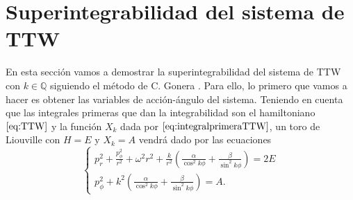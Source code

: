 \documentclass[12pt,a4paper,twoside]{article}
\theoremstyle{definition} \newtheorem{defn}[thm]{Definición}
\theoremstyle{definition} \newtheorem{ejemplo}[thm]{Ejemplo}
\theoremstyle{definition} \newtheorem{ejercicio}[thm]{Ejercicio}
\theoremstyle{remark} \newtheorem*{obs}{Observación}
\def\QQ{\mathbb{Q}}
\begin{document}
\section{Superintegrabilidad del sistema de TTW}
En esta sección vamos a demostrar la superintegrabilidad del sistema de TTW con $k\in \QQ$ siguiendo el método de C. Gonera \cite{gonera}. Para ello, lo primero que vamos a hacer es obtener las variables de acción-ángulo del sistema. Teniendo en cuenta que las integrales primeras que dan la integrabilidad son el hamiltoniano $\eqref{eq:TTW}$ y la función $X_k$ dada por $\eqref{eq:integralprimeraTTW}$, un toro de Liouville con $H=E$ y $X_k=A$ vendrá dado por las ecuaciones
\begin{equation}
  \begin{cases}
    p_r^2+\frac{p_{\phi}^2}{r^2}+\omega^2r^2 + \frac{k}{r^2}\left( \frac{\alpha}{\cos^2k\phi} +\frac{\beta}{\sin^2k\phi}\right) = 2E \\
    p_{\phi}^2+k^2\left( \frac{\alpha}{\cos^2k\phi} +\frac{\beta}{\sin^2k\phi}\right)=A.
  \end{cases}
\end{equation}
\end{document}
